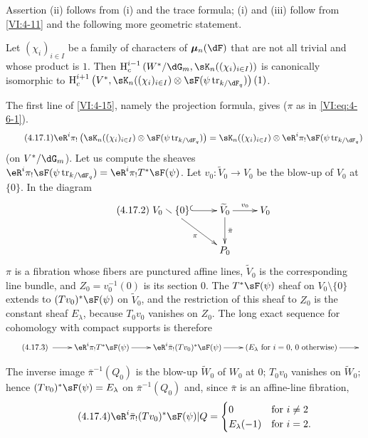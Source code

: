 Assertion (ii) follows from (i) and the trace formula; (i) and (iii) 
follow from \ref{VI:4-11} and the following more geometric statement. 





\begin{proposition_}\label{VI:4-17}
Let $(\chi_i)_{i\in I}$ be a family of characters of 
$\dmu_n(\dF)$ that are not all trivial and whose product is $1$. Then 
$\h_c^{i-1}\left(W^\ast/\dG_m,\sK_n((\chi_i)_{i\in I})\right)$ is 
canonically isomorphic to 
\newline
$\h_c^{i+1}\left(V^\ast,\sK_n((\chi_i)_{i\in I})\otimes \sF(\psi\tr_{k/\dF_q})\right)(1)$. 
\end{proposition_}

The first line of \ref{VI:4-15}, namely the projection formula, gives ($\pi$ as in 
\eqref{VI:eq:4-6-1}). 
\begin{equation*}\tag{4.17.1}\label{VI:eq:4-17-1}
  \eR^i \pi_!\left(\sK_n((\chi_i)_{i\in I})\otimes \sF(\psi \tr_{k/\dF_q})\right) = \sK_n((\chi_i)_{i\in I}) \otimes \eR^i \pi_! \sF(\psi\tr_{k/\dF_q}) 
\end{equation*}
(on $V^\ast/\dG_m$). Let us compute the sheaves 
$\eR^i\pi_! \sF(\psi\tr_{k/\dF_q}) = \eR^i \pi_! T^\ast \sF(\psi)$. Let 
$v_0:\widetilde V_0 \to V_0$ be the blow-up of $V_0$ at $\{0\}$. In the 
diagram 
\begin{equation*}\tag{4.17.2}\label{VI:eq:4-17-2}
\xymatrix{
  V_0\setminus \{0\} \ar@{^{(}->}[r] \ar[dr]_-\pi 
    & \widetilde V_0 \ar[r]^-{v_0} \ar[d]^-{\bar\pi} 
    & V_0 \\
  & P_0 
}
\end{equation*}
$\pi$ is a fibration whose fibers are punctured affine lines, $\widetilde V_0$ 
is the corresponding line bundle, and $Z_0=v_0^{-1}(0)$ is its section $0$. 
The $T^\ast\sF(\psi)$ sheaf on $V_0\setminus \{0\}$ extends to 
$(T v_0)^\ast \sF(\psi)$ on $\widetilde V_0$, and the restriction of this sheaf 
to $Z_0$ is the constant sheaf $E_\lambda$, because $T_0 v_0$ vanishes on 
$Z_0$. The long exact sequence for cohomology with compact supports is therefore 
\begin{equation*}\tag{4.17.3}\label{VI:eq:4-17-3}
\xymatrix{
  \ar[r] 
    & \eR^i \pi_! T^\ast \sF(\psi) \ar[r] 
    & \eR^i \bar\pi_! (T v_0)^\ast \sF(\psi) \ar[r] 
    & (E_\lambda\text{ for $i=0$, $0$ otherwise}) \ar[r] 
    & 
}
\end{equation*}

The inverse image $\bar\pi^{-1}(Q_0)$ is the blow-up $\widetilde W_0$ of 
$W_0$ at $0$; $T_0 v_0$ vanishes on $\widetilde W_0$; hence 
$(T v_0)^\ast \sF(\psi)=E_\lambda$ on $\bar\pi^{-1}(Q_0)$ and, since $\bar\pi$ is an 
affine-line fibration, 
\begin{equation*}\tag{4.17.4}\label{VI:eq:4-17-4}
  \eR^i \bar\pi_! (T v_0)^\ast \sF(\psi)|Q = 
    \begin{cases}
      0 & \text{for $i\ne 2$} \\
      E_\lambda(-1) & \text{for $i=2$.} 
    \end{cases} 
\end{equation*}

